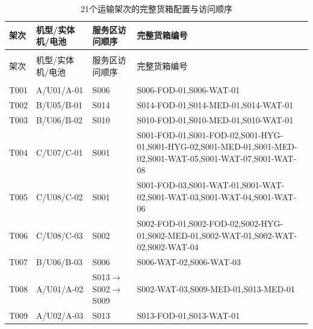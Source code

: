 \begingroup
\small
\setlength{\tabcolsep}{3pt}
\renewcommand{\arraystretch}{1.10}
\begin{longtable}{@{}>{\centering\arraybackslash}p{1.00cm}>{\raggedright\arraybackslash}p{2.80cm}>{\raggedright\arraybackslash}p{3.10cm}>{\raggedright\arraybackslash}p{7.60cm}@{}}
\caption{21个运输架次的完整货箱配置与访问顺序}\label{tab:q3-full-config}\\
\toprule
架次 & 机型/实体机/电池 & 服务区访问顺序 & 完整货箱编号 \\
\midrule
\endfirsthead
\multicolumn{4}{c}{\small 表~\thetable{}（续）}\\
\toprule
架次 & 机型/实体机/电池 & 服务区访问顺序 & 完整货箱编号 \\
\midrule
\endhead
\midrule
\multicolumn{4}{r}{\small 续下页}\\
\endfoot
\bottomrule
\endlastfoot
T001 & A/U01/A-01 & S006 & \mbox{S006-FOD-01},\allowbreak \mbox{S006-WAT-01} \\
T002 & B/U05/B-01 & S014 & \mbox{S014-FOD-01},\allowbreak \mbox{S014-MED-01},\allowbreak \mbox{S014-WAT-01} \\
T003 & B/U06/B-02 & S010 & \mbox{S010-FOD-01},\allowbreak \mbox{S010-MED-01},\allowbreak \mbox{S010-WAT-01} \\
T004 & C/U07/C-01 & S001 & \mbox{S001-FOD-01},\allowbreak \mbox{S001-FOD-02},\allowbreak \mbox{S001-HYG-01},\allowbreak \mbox{S001-HYG-02},\allowbreak \mbox{S001-MED-01},\allowbreak \mbox{S001-MED-02},\allowbreak \mbox{S001-WAT-05},\allowbreak \mbox{S001-WAT-07},\allowbreak \mbox{S001-WAT-08} \\
T005 & C/U08/C-02 & S001 & \mbox{S001-FOD-03},\allowbreak \mbox{S001-WAT-01},\allowbreak \mbox{S001-WAT-02},\allowbreak \mbox{S001-WAT-03},\allowbreak \mbox{S001-WAT-04},\allowbreak \mbox{S001-WAT-06} \\
T006 & C/U08/C-03 & S002 & \mbox{S002-FOD-01},\allowbreak \mbox{S002-FOD-02},\allowbreak \mbox{S002-HYG-01},\allowbreak \mbox{S002-MED-01},\allowbreak \mbox{S002-WAT-01},\allowbreak \mbox{S002-WAT-02},\allowbreak \mbox{S002-WAT-04} \\
T007 & B/U06/B-03 & S006 & \mbox{S006-WAT-02},\allowbreak \mbox{S006-WAT-03} \\
T008 & A/U01/A-02 & S013$\to$S002$\to$S009 & \mbox{S002-WAT-03},\allowbreak \mbox{S009-MED-01},\allowbreak \mbox{S013-MED-01} \\
T009 & A/U02/A-03 & S013 & \mbox{S013-FOD-01},\allowbreak \mbox{S013-WAT-01} \\

\end{longtable}
